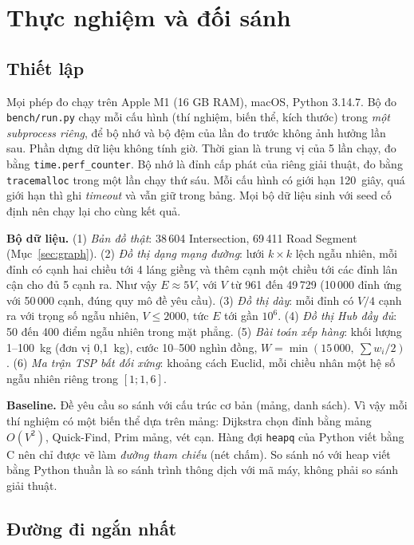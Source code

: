 \section{Thực nghiệm và đối sánh}
\label{sec:experiments}

\subsection{Thiết lập}

Mọi phép đo chạy trên Apple M1 (16 GB RAM), macOS, Python 3.14.7. Bộ đo \texttt{bench/run.py} chạy mỗi cấu hình
(thí nghiệm, biến thể, kích thước) trong \emph{một subprocess riêng}, để bộ nhớ và bộ đệm của lần đo trước
không ảnh hưởng lần sau. Phần dựng dữ liệu không tính giờ. Thời gian là trung vị của 5 lần chạy, đo bằng
\texttt{time.perf\_counter}. Bộ nhớ là đỉnh cấp phát của riêng giải thuật, đo bằng \texttt{tracemalloc} trong một lần chạy
thứ sáu. Mỗi cấu hình có giới hạn 120~giây, quá giới hạn thì ghi \emph{timeout} và vẫn giữ trong bảng. Mọi bộ dữ liệu
sinh với seed cố định nên chạy lại cho cùng kết quả.

\textbf{Bộ dữ liệu.}
(1) \emph{Bản đồ thật}: 38\,604 Intersection, 69\,411 Road Segment (Mục~\ref{sec:graph}).
(2) \emph{Đồ thị dạng mạng đường}: lưới $k\times k$ lệch ngẫu nhiên, mỗi đỉnh có cạnh hai chiều tới 4 láng giềng và thêm
cạnh một chiều tới các đỉnh lân cận cho đủ 5 cạnh ra. Như vậy $E\approx 5V$, với $V$ từ 961 đến 49\,729 (10\,000 đỉnh ứng
với 50\,000 cạnh, đúng quy mô đề yêu cầu).
(3) \emph{Đồ thị dày}: mỗi đỉnh có $V/4$ cạnh ra với trọng số ngẫu nhiên, $V\le 2000$, tức $E$ tới gần $10^6$.
(4) \emph{Đồ thị Hub đầy đủ}: 50 đến 400 điểm ngẫu nhiên trong mặt phẳng.
(5) \emph{Bài toán xếp hàng}: khối lượng 1--100~kg (đơn vị 0{,}1~kg), cước 10--500 nghìn đồng,
$W=\min(15\,000,\ \sum w_i/2)$.
(6) \emph{Ma trận TSP bất đối xứng}: khoảng cách Euclid, mỗi chiều nhân một hệ số ngẫu nhiên riêng trong $[1;1{,}6]$.

\textbf{Baseline.} Đề yêu cầu so sánh với cấu trúc cơ bản (mảng, danh sách). Vì vậy mỗi thí nghiệm có một biến thể
dựa trên mảng: Dijkstra chọn đỉnh bằng mảng $O(V^2)$, Quick-Find, Prim mảng, vét cạn. Hàng đợi \texttt{heapq} của Python
viết bằng C nên chỉ được vẽ làm \emph{đường tham chiếu} (nét chấm). So sánh nó với heap viết bằng Python thuần là so sánh
trình thông dịch với mã máy, không phải so sánh giải thuật.

\subsection{Đường đi ngắn nhất}

